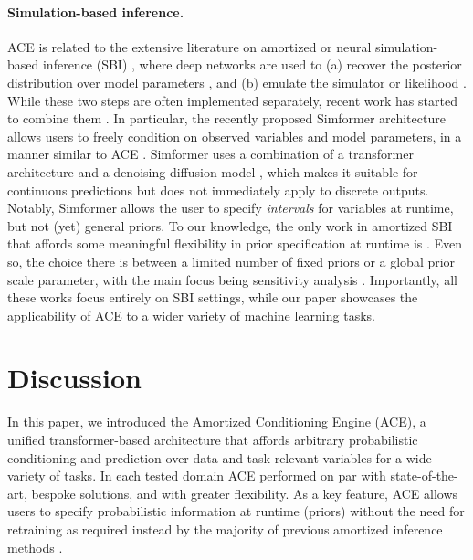 \documentclass[twoside]{article}
\begin{document}
\paragraph{Simulation-based inference.} ACE is related to the extensive literature on amortized or neural simulation-based inference (SBI) \citep{cranmer2020frontier}, where deep networks are used to (a) recover the posterior distribution over model parameters \citep{lueckmann2017flexible}, and (b) emulate the simulator or likelihood \citep{papamakarios2019sequential}. While these two steps are often implemented separately, recent work has started to combine them \citep{radev2023jana}. In particular, the recently proposed Simformer architecture allows users to freely condition on observed variables and model parameters, in a manner similar to ACE \citep{gloeckler2024all}. Simformer uses a combination of a transformer architecture and a denoising diffusion model \citep{song2019generative}, which makes it suitable for continuous predictions but does not immediately apply to discrete outputs. Notably, Simformer allows the user to specify \emph{intervals} for variables at runtime, but not (yet) general priors. To our knowledge, the only work in amortized SBI that affords some meaningful flexibility in prior specification at runtime is \citet{elsemueller2024sensitivity}. Even so, the choice there is between a limited number of fixed priors or a global prior scale parameter, with the main focus being sensitivity analysis \citep{elsemueller2024sensitivity}. Importantly, all these works focus entirely on SBI settings, while our paper showcases the applicability of ACE to a wider variety of machine learning tasks.

\vspace{-0.25em}
\section{Discussion}
\label{sec:discussion}\label{sec:limitations}

\vspace{-0.25em}
In this paper, we introduced the Amortized Conditioning Engine (ACE), a unified transformer-based architecture that affords arbitrary probabilistic conditioning and prediction over data and task-relevant variables for a wide variety of tasks.
In each tested domain ACE performed on par with state-of-the-art, bespoke solutions, and with greater flexibility. As a key feature, ACE allows users to specify probabilistic information at runtime (priors) without the need for retraining as required instead by the majority of previous amortized inference methods \citep{cranmer2020frontier}.
\end{document}
